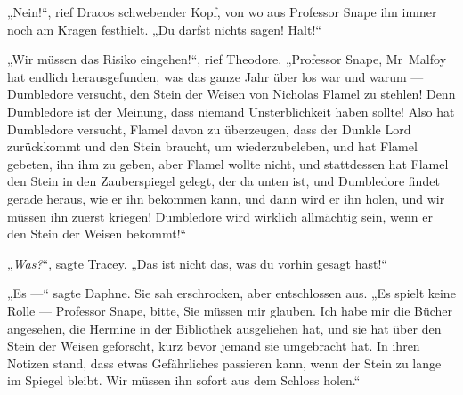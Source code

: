 „Nein!“, rief Dracos schwebender Kopf, von wo aus Professor Snape ihn immer noch am Kragen festhielt.
„Du darfst nichts sagen! Halt!“

„Wir müssen das Risiko eingehen!“, rief Theodore.
„Professor Snape, Mr~Malfoy hat endlich herausgefunden, was das ganze Jahr über los war und warum — Dumbledore versucht, den Stein der Weisen von Nicholas Flamel zu stehlen! Denn Dumbledore ist der Meinung, dass niemand Unsterblichkeit haben sollte! Also hat Dumbledore versucht, Flamel davon zu überzeugen, dass der Dunkle Lord zurückkommt und den Stein braucht, um wiederzubeleben, und hat Flamel gebeten, ihn ihm zu geben, aber Flamel wollte nicht, und stattdessen hat Flamel den Stein in den Zauberspiegel gelegt, der da unten ist, und Dumbledore findet gerade heraus, wie er ihn bekommen kann, und dann wird er ihn holen, und wir müssen ihn zuerst kriegen! Dumbledore wird wirklich allmächtig sein, wenn er den Stein der Weisen bekommt!“

„\emph{Was?}“, sagte Tracey.
„Das ist nicht das, was du vorhin gesagt hast!“

„Es —“ sagte Daphne. Sie sah erschrocken, aber entschlossen aus.
„Es spielt keine Rolle — Professor Snape, bitte, Sie müssen mir glauben. Ich habe mir die Bücher angesehen, die Hermine in der Bibliothek ausgeliehen hat, und sie hat über den Stein der Weisen geforscht, kurz bevor jemand sie umgebracht hat. In ihren Notizen stand, dass etwas Gefährliches passieren kann, wenn der Stein zu lange im Spiegel bleibt. Wir müssen ihn sofort aus dem Schloss holen.“

